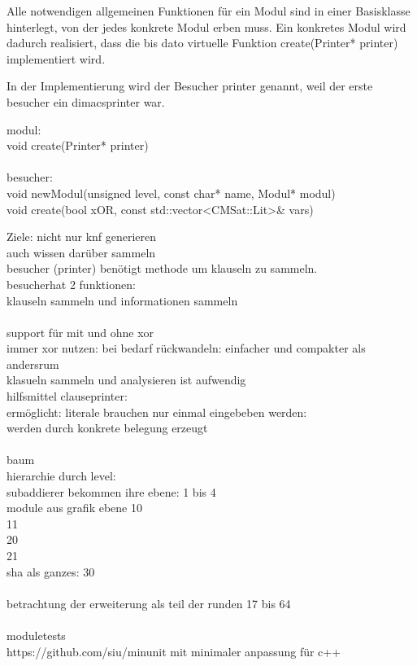 Alle notwendigen allgemeinen Funktionen für ein Modul sind in einer Basisklasse hinterlegt, von der jedes konkrete Modul erben muss. Ein konkretes Modul wird
dadurch realisiert, dass die bis dato virtuelle Funktion create(Printer* printer) implementiert wird.



In der Implementierung wird der Besucher printer genannt, weil der erste besucher ein dimacsprinter war.



modul:\\
void create(Printer* printer)\\
~\\
besucher:\\
void newModul(unsigned level, const char* name, Modul* modul)\\
void create(bool xOR, const std::vector<CMSat::Lit>\& vars)





Ziele:  nicht nur knf generieren\\
auch wissen darüber sammeln\\
besucher (printer) benötigt methode um klauseln zu sammeln.
~\\
besucherhat 2 funktionen:\\
klauseln sammeln und informationen sammeln\\
~\\
support für mit und ohne xor\\
immer xor nutzen: bei bedarf rückwandeln: einfacher und compakter als andersrum\\
klasueln sammeln und analysieren ist aufwendig
~\\
hilfsmittel clauseprinter:\\
ermöglicht: literale brauchen nur einmal eingebeben werden:\\
werden durch konkrete belegung erzeugt\\
~\\
baum\\
hierarchie durch level:\\
subaddierer bekommen ihre ebene: 1 bis 4\\
module aus grafik ebene 10\\
11\\
20\\
21\\
sha als ganzes: 30\\
~\\
betrachtung der erweiterung als teil der runden 17 bis 64\\
~\\
moduletests\\
https://github.com/siu/minunit mit minimaler anpassung für c++








